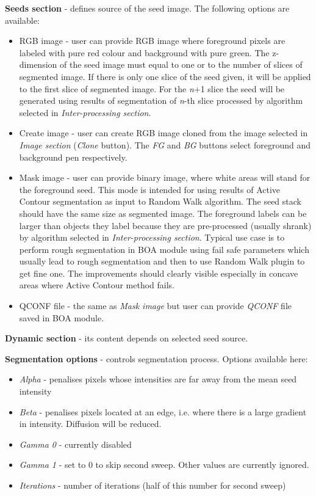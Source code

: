 \documentclass[a4paper,12pt]{article}
\begin{document}
\textbf{Seeds section} - defines source of the seed image. The following options are available:
\begin{itemize}
	\item RGB image - user can provide RGB image where foreground pixels are labeled with pure red colour and background with pure green. The z-dimension of the seed image must equal to one or to the number of slices of segmented image. If there is only one slice of the seed given, it will be applied to the first slice of segmented image. For the \textit{n}+1 slice the seed will be generated using results of segmentation of \textit{n}-th slice processed by algorithm selected in \textit{Inter-processing section}.
	\item Create image - user can create RGB image cloned from the image selected in \textit{Image section} (\textit{Clone} button). The \textit{FG} and \textit{BG} buttons select foreground and background pen respectively.
	\item Mask image - user can provide binary image, where white areas will stand for the foreground seed. This mode is intended for using results of Active Contour segmentation as input to Random Walk algorithm. The seed stack should have the same size as segmented image. The foreground labels can be larger than objects they label because they are pre-processed (usually shrank) by algorithm selected in \textit{Inter-processing section}. Typical use case is to perform rough segmentation in BOA module using fail safe parameters which usually lead to rough segmentation and then to use Random Walk plugin to get fine one. The improvements should clearly visible especially in concave areas where Active Contour method fails.     
	\item QCONF file - the same as \textit{Mask image} but user can provide \textit{QCONF} file saved in BOA module.    
\end{itemize}
  
\textbf{Dynamic section} - its content depends on selected seed source.

\textbf{Segmentation options} - controls segmentation process. Options available here:
\begin{itemize}
	\item \textit{Alpha} - penalises pixels whose intensities are far away from the mean seed intensity
	\item \textit{Beta} - penalises pixels located at an edge, i.e. where there is a large gradient in intensity. Diffusion will be reduced.
	\item \textit{Gamma 0} - currently disabled
	\item \textit{Gamma 1} - set to 0 to skip second sweep. Other values are currently ignored.
	\item \textit{Iterations} - number of iterations (half of this number for second sweep)
\end{itemize}
\end{document}
